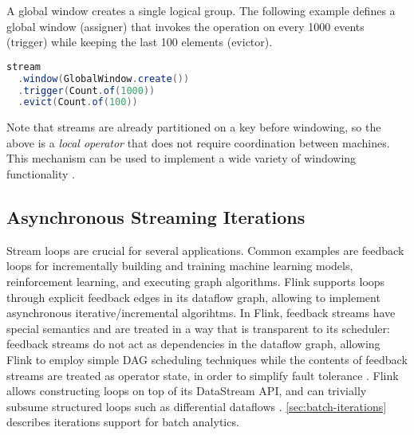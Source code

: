 \noindent A global window creates a single logical group. The following example defines a global window (assigner) that invokes the operation on every 1000 events (trigger) while keeping the last 100 elements (evictor). 

\begin{lstlisting}[language=Java]
stream
  .window(GlobalWindow.create())
  .trigger(Count.of(1000))
  .evict(Count.of(100))
\end{lstlisting}

Note that streams are already partitioned on a key before windowing, so the above is a \textit{local operator} that does not require coordination between machines. This mechanism can be used to implement a wide variety of windowing functionality \cite{akidau2015dataflow}. 

\subsection{Asynchronous Streaming Iterations}
Stream loops are crucial for several applications. Common examples are feedback loops for incrementally building and training machine learning models, reinforcement learning, and executing graph algorithms. Flink supports loops through explicit feedback edges in its dataflow graph, allowing to implement asynchronous iterative/incremental algorihtms. In Flink, feedback streams have special semantics and are treated in a way that is transparent to its scheduler: feedback streams do not act as dependencies in the dataflow graph, allowing Flink to employ simple DAG scheduling techniques while the contents of feedback streams are treated as operator state, in order to simplify fault tolerance \cite{carbone2015lightweight}. Flink allows constructing loops on top of its DataStream API, and can trivially subsume structured loops such as differential dataflows \cite{murray2013naiad}. \autoref{sec:batch-iterations} describes iterations support for batch analytics.
